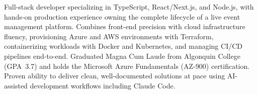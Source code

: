 \documentclass[11pt,a4paper,sans]{moderncv}
\begin{document}
\makecvtitle



\vspace{6pt}
\small{Full-stack developer specializing in TypeScript, React/Next.js, and Node.js, with hands-on production experience owning the complete lifecycle of a live event management platform. Combines front-end precision with cloud infrastructure fluency, provisioning Azure and AWS environments with Terraform, containerizing workloads with Docker and Kubernetes, and managing CI/CD pipelines end-to-end. Graduated Magna Cum Laude from Algonquin College (GPA~3.7) and holds the Microsoft Azure Fundamentals (AZ-900) certification. Proven ability to deliver clean, well-documented solutions at pace using AI-assisted development workflows including Claude Code.}


\end{document}
